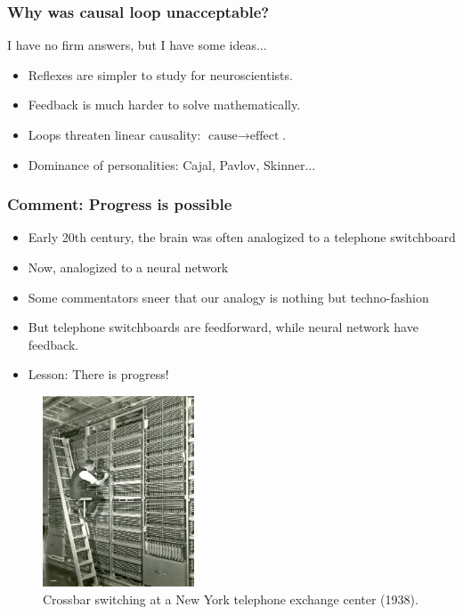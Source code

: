 \documentclass{beamer}
\begin{document}
\begin{frame}
    \frametitle{Why was causal loop unacceptable?}
    I have no firm answers, but I have some ideas...

    \begin{itemize}
        \item Reflexes are simpler to study for neuroscientists.
        \item Feedback is much harder to solve mathematically.
        \item Loops threaten linear causality: $\text{cause}\to\text{effect}$.
        \item Dominance of personalities: Cajal, Pavlov, Skinner...
    \end{itemize}
\end{frame}

\begin{frame}
    \frametitle{Comment: Progress is possible}
    \begin{itemize}
        \item Early 20th century, the brain was often analogized to a telephone switchboard
        \item Now, analogized to a neural network
        \item Some commentators sneer that our analogy is nothing but techno-fashion
        \item But telephone switchboards are feedforward, while neural network have feedback.
        \item Lesson: There is progress!
    \end{itemize}
    \begin{figure}[t]
        \includegraphics[width=0.4\textwidth]{figure/Crossbar_NY_1938-05.jpg}
        \centering
        \caption{Crossbar switching at a New York telephone exchange center (1938).}
    \end{figure}
    
\end{frame}
\end{document}
